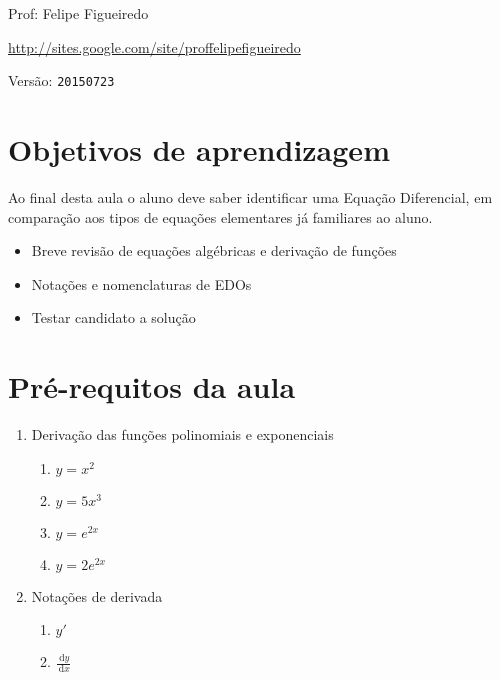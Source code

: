 \documentclass[a4paper]{article}
\newcommand{\ud}{\mathrm{\ d}}
\begin{document}
\parbox[c]{.825\textwidth}{\raggedright%
{Prof: Felipe Figueiredo\par}
{\url{http://sites.google.com/site/proffelipefigueiredo}\par}
}

Versão: \verb|20150723|



\section{Objetivos de aprendizagem}

Ao final desta aula o aluno deve saber identificar uma Equação
Diferencial, em comparação aos tipos de equações elementares já
familiares ao aluno.

\begin{itemize}
\item Breve revisão de equações algébricas e derivação de funções
\item Notações e nomenclaturas de EDOs
\item Testar candidato a solução
\end{itemize}


\section{Pré-requitos da aula}

\begin{enumerate}
\item Derivação das funções polinomiais e exponenciais
  \begin{enumerate}
  \item $y=x^2$
  \item $y=5x^3$
  \item $y=e^{2x}$
  \item $y=2e^{2x}$
  \end{enumerate}
\item Notações de derivada
  \begin{enumerate}
  \item $y'$
  \item $\frac{\ud y}{\ud x}$
  \end{enumerate}
\end{enumerate}
\end{document}
